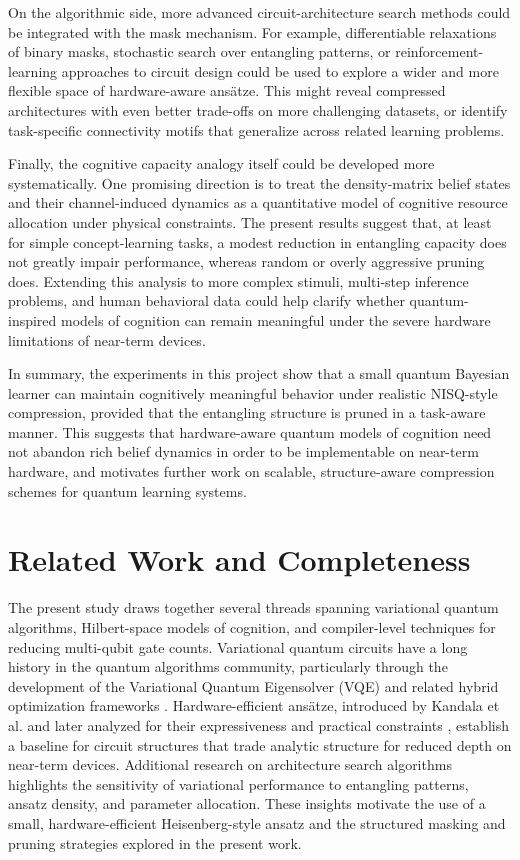 \documentclass[conference]{IEEEtran}
\begin{document}
On the algorithmic side, more advanced circuit-architecture search methods
could be integrated with the mask mechanism. For example, differentiable
relaxations of binary masks, stochastic search over entangling patterns, or
reinforcement-learning approaches to circuit design could be used to explore
a wider and more flexible space of hardware-aware ansätze. This might reveal
compressed architectures with even better trade-offs on more challenging
datasets, or identify task-specific connectivity motifs that generalize across
related learning problems.

Finally, the cognitive capacity analogy itself could be developed more
systematically. One promising direction is to treat the density-matrix belief
states and their channel-induced dynamics as a quantitative model of cognitive
resource allocation under physical constraints. The present results suggest
that, at least for simple concept-learning tasks, a modest reduction in
entangling capacity does not greatly impair performance, whereas random or
overly aggressive pruning does. Extending this analysis to more complex
stimuli, multi-step inference problems, and human behavioral data could help
clarify whether quantum-inspired models of cognition can remain meaningful
under the severe hardware limitations of near-term devices.

In summary, the experiments in this project show that a small quantum Bayesian
learner can maintain cognitively meaningful behavior under realistic
NISQ-style compression, provided that the entangling structure is pruned in a
task-aware manner. This suggests that hardware-aware quantum models of
cognition need not abandon rich belief dynamics in order to be implementable
on near-term hardware, and motivates further work on scalable, structure-aware
compression schemes for quantum learning systems.

\section{Related Work and Completeness}

The present study draws together several threads spanning variational quantum algorithms, Hilbert-space models of cognition, and compiler-level techniques for reducing multi-qubit gate counts. Variational quantum circuits have a long history in the quantum algorithms community, particularly through the development of the Variational Quantum Eigensolver (VQE) and related hybrid optimization frameworks \cite{b4,b6,b7}. Hardware-efficient ansätze, introduced by Kandala et al. \cite{b4} and later analyzed for their expressiveness and practical constraints \cite{b5}, establish a baseline for circuit structures that trade analytic structure for reduced depth on near-term devices. Additional research on architecture search algorithms \cite{b16,b17} highlights the sensitivity of variational performance to entangling patterns, ansatz density, and parameter allocation. These insights motivate the use of a small, hardware-efficient Heisenberg-style ansatz and the structured masking and pruning strategies explored in the present work.
\end{document}
